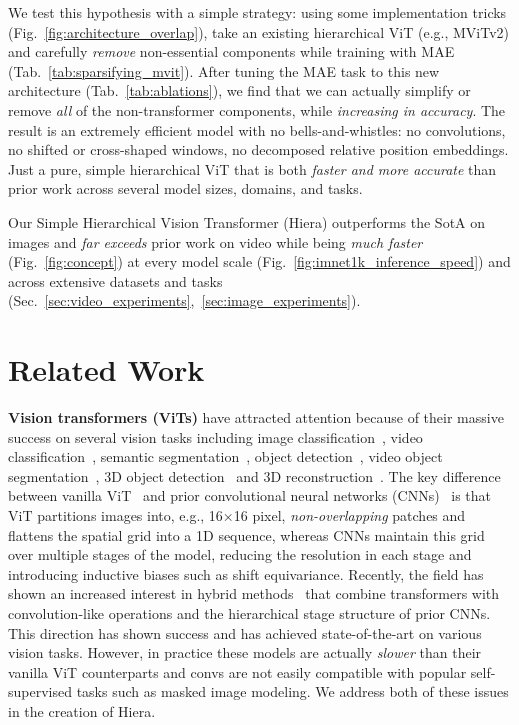 \documentclass[nohyperref]{article}
\newcommand{\img}[1]{\textcolor{imgcolor}{#1}}
\newcommand{\vid}[1]{\textcolor{vidcolor}{#1}}
\newcommand{\fullname}{Simple Hierarchical Vision Transformer}
\newcommand{\name}{{Hiera}}
\newcommand{\shortname}{{Hiera}}
\theoremstyle{plain}
\theoremstyle{definition}
\theoremstyle{remark}
\begin{document}
We test this hypothesis with a simple strategy: using some implementation tricks (Fig.~\ref{fig:architecture_overlap}), take an existing hierarchical ViT (e.g., MViTv2) and carefully \textit{remove} non-essential components while training with MAE (Tab.~\ref{tab:sparsifying_mvit}). After tuning the MAE task to this new architecture (Tab.~\ref{tab:ablations}), we find that we can actually simplify or remove \textit{all} of the non-transformer components, while \textit{increasing in accuracy}. The result is an extremely efficient model with no bells-and-whistles: no convolutions, no shifted or cross-shaped windows, no decomposed relative position embeddings. Just a pure, simple hierarchical ViT that is both \textit{faster and more accurate} than prior work across several model sizes, domains, and tasks.

Our \fullname{} (\shortname{}) outperforms the SotA on \img{images} and \textit{far exceeds} prior work on \vid{video} while being \textit{much faster} (Fig.~\ref{fig:concept}) at every model scale (Fig.~\ref{fig:imnet1k_inference_speed}) and across extensive datasets and tasks (Sec.~\ref{sec:video_experiments},~\ref{sec:image_experiments}).


\section{Related Work}
\noindent\textbf{Vision transformers (ViTs)} have attracted attention because of their massive success on several vision tasks including image classification~\cite{vit}, video classification~\cite{mvitv1,vivit,bertasius2021space}, semantic segmentation~\cite{ranftl2021vision}, object detection~\cite{carion2020end,vitdet}, video object segmentation~\cite{duke2021sstvos}, 3D object detection~\cite{misra2021end} and 3D reconstruction~\cite{bozic2021transformerfusion}. The key difference between vanilla ViT~\cite{vit} and prior convolutional neural networks (CNNs)~\cite{lecun1998gradient} is that ViT partitions images into, e.g., 16×16 pixel, \emph{non-overlapping} patches and flattens the spatial grid into a 1D sequence, whereas CNNs maintain this grid over multiple stages of the model, reducing the resolution in each stage and introducing inductive biases such as shift equivariance. Recently, the field has shown an increased interest in hybrid methods~\cite{mvitv1,swin,mvitv2,cswin,pvt} that combine transformers with convolution-like operations and the hierarchical stage structure of prior CNNs. This direction has shown success and has achieved state-of-the-art on various vision tasks. However, in practice these models are actually \textit{slower} than their vanilla ViT counterparts and convs are not easily compatible with popular self-supervised tasks such as masked image modeling. We address both of these issues in the creation of \name{}.
\end{document}
